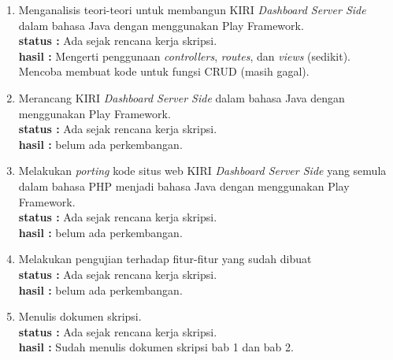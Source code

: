 \documentclass[a4paper,twoside]{article}
\begin{document}
\begin{enumerate}
\begin{itemize}
Berikut adalah contoh sebuah data JSON:
\begin{lstlisting}
	{
		"status":"error",
		"message":"Value of userid is expected but not found"
	}
\end{lstlisting}

Contoh kode di atas adalah sebuah objek (baris 1-4) yang memiliki 2 buah pasangan ``\texttt{nama:nilai}'' yang dipisahkan oleh karakter ``\texttt{,}'' (baris 2-3). Contoh di atas juga menggunakan \textit{string} sebagai nilainya (baris 2 dan 3).


		\end{itemize}

		\item Menganalisis teori-teori untuk membangun KIRI \textit{Dashboard Server Side} dalam bahasa Java dengan menggunakan Play Framework.\\
		{\bf status :} Ada sejak rencana kerja skripsi.\\
		{\bf hasil :} Mengerti penggunaan \textit{controllers}, \textit{routes}, dan \textit{views} (sedikit). Mencoba membuat kode untuk fungsi CRUD (masih gagal).

		\item Merancang KIRI \textit{Dashboard Server Side} dalam bahasa Java dengan menggunakan Play Framework.\\
		{\bf status :} Ada sejak rencana kerja skripsi.\\
		{\bf hasil :} belum ada perkembangan.

		\item Melakukan \textit{porting} kode situs web KIRI \textit{Dashboard Server Side} yang semula dalam bahasa PHP menjadi bahasa Java dengan menggunakan Play Framework.\\
		{\bf status :} Ada sejak rencana kerja skripsi.\\
		{\bf hasil :} belum ada perkembangan.
		
		\item Melakukan pengujian terhadap fitur-fitur yang sudah dibuat\\
		{\bf status :} Ada sejak rencana kerja skripsi.\\
		{\bf hasil :} belum ada perkembangan.

		\item Menulis dokumen skripsi.\\
		{\bf status :} Ada sejak rencana kerja skripsi.\\
		{\bf hasil :} Sudah menulis dokumen skripsi bab 1 dan bab 2.
	\end{enumerate}
\end{document}
